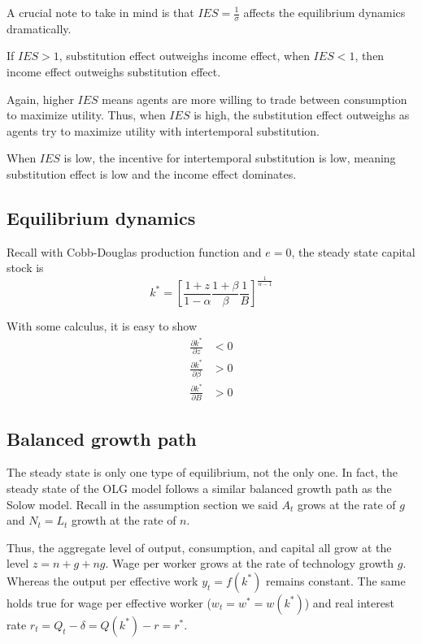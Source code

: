 \documentclass[twocolumn, fleqn]{article}
\begin{document}
			A crucial note to take in mind is that $IES = \frac{1}{\sigma}$ affects the equilibrium dynamics
			dramatically.

			If $IES>1$, substitution effect outweighs income effect, when $IES<1$, then income effect outweighs
			substitution effect.

			Again, higher $IES$ means agents are more willing to trade between consumption to maximize utility.
			Thus, when $IES$ is high, the substitution effect outweighs as agents try to maximize utility with intertemporal
			substitution.

			When $IES$ is low, the incentive for intertemporal substitution is low, meaning substitution effect is low
			and the income effect dominates.

		\subsection{Equilibrium dynamics}\label{subsec:equilibrium-dynamics}

			Recall with Cobb-Douglas production function and $e = 0$, the steady state capital stock is
			\[k^\ast = \left[ \frac{1+z}{1-\alpha} \frac{1+\beta}{\beta} \frac{1}{B} \right]^{\frac{1}{\alpha -1}}\]

			With some calculus, it is easy to show
			\begin{align*}
				\frac{\partial k^\ast}{\partial z} &< 0\\
				\frac{\partial k^\ast}{\partial \beta} &> 0\\
				\frac{\partial k^\ast}{\partial B} &> 0
			\end{align*}

		\subsection{Balanced growth path}\label{subsec:balanced-growth-path}
			The steady state is only one type of equilibrium, not the only one.
			In fact, the steady state of the OLG model follows a similar balanced growth path as the Solow model.
			Recall in the assumption section we said $A_t$ grows at the rate of $g$ and $N_t=L_t$ growth at the rate
			of $n$.

			Thus, the aggregate level of output, consumption, and capital all grow at the level $z = n+g+ng$.
			Wage per worker grows at the rate of technology growth $g$.
			Whereas the output per effective work $y_t = f(k^\ast)$ remains constant.
			The same holds true for wage per effective worker ($w_t = w^\ast = w(k^\ast)$) and real interest rate
			$r_t = Q_t -\delta=Q(k^\ast)-r=r^\ast$.
\end{document}
